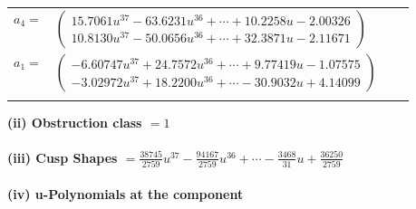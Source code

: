 \documentclass[1p]{elsarticle_modified}
\theoremstyle{definition}
\begin{document}
\begin{tabular}{m{7pt} m{180pt} m{7pt} m{180pt} }
\flushright $a_{4}=$&$\begin{pmatrix}15.7061 u^{37}-63.6231 u^{36}+\cdots+10.2258 u-2.00326\\10.8130 u^{37}-50.0656 u^{36}+\cdots+32.3871 u-2.11671\end{pmatrix}$ \\
\flushright $a_{1}=$&$\begin{pmatrix}-6.60747 u^{37}+24.7572 u^{36}+\cdots+9.77419 u-1.07575\\-3.02972 u^{37}+18.2200 u^{36}+\cdots-30.9032 u+4.14099\end{pmatrix}$\\&\end{tabular}
\flushleft \textbf{(ii) Obstruction class $= 1$}\\~\\
\flushleft \textbf{(iii) Cusp Shapes $= \frac{38745}{2759} u^{37}-\frac{94167}{2759} u^{36}+\cdots-\frac{3468}{31} u+\frac{36250}{2759}$}\\~\\
\newpage\renewcommand{\arraystretch}{1}
\flushleft \textbf{(iv) u-Polynomials at the component}\newline \\
\end{document}
